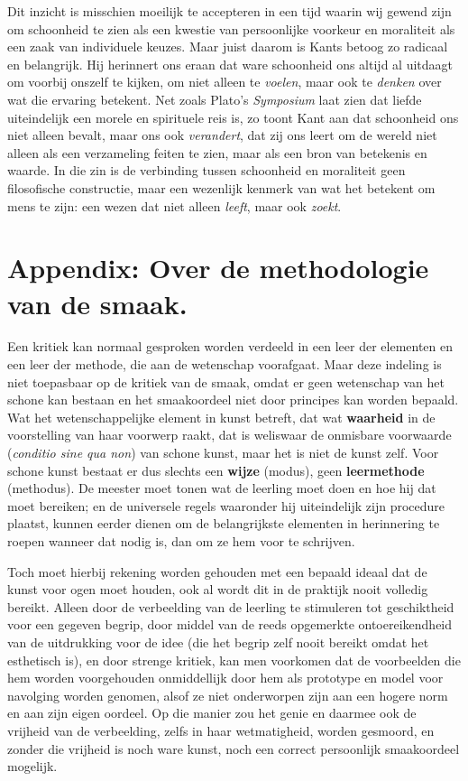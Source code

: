 \begin{mdframed}[leftmargin=0pt,rightmargin=0pt,backgroundcolor=blue!6,linecolor=white,innertopmargin=6pt,innerbottommargin=6pt]
Dit inzicht is misschien moeilijk te accepteren in een tijd waarin wij gewend zijn om schoonheid te zien als een kwestie van persoonlijke voorkeur en moraliteit als een zaak van individuele keuzes. Maar juist daarom is Kants betoog zo radicaal en belangrijk. Hij herinnert ons eraan dat ware schoonheid ons altijd al uitdaagt om voorbij onszelf te kijken, om niet alleen te \textit{voelen}, maar ook te \textit{denken} over wat die ervaring betekent. Net zoals Plato's \textit{Symposium} laat zien dat liefde uiteindelijk een morele en spirituele reis is, zo toont Kant aan dat schoonheid ons niet alleen bevalt, maar ons ook \textit{verandert}, dat zij ons leert om de wereld niet alleen als een verzameling feiten te zien, maar als een bron van betekenis en waarde. In die zin is de verbinding tussen schoonheid en moraliteit geen filosofische constructie, maar een wezenlijk kenmerk van wat het betekent om mens te zijn: een wezen dat niet alleen \textit{leeft}, maar ook \textit{zoekt}.
\end{mdframed}

\section{Appendix: Over de methodologie van de smaak.}

Een kritiek kan normaal gesproken worden verdeeld in een leer der elementen en een leer der methode, die aan de wetenschap voorafgaat. Maar deze indeling is niet toepasbaar op de kritiek van de smaak, omdat er geen wetenschap van het schone kan bestaan en het smaakoordeel niet door principes kan worden bepaald. Wat het wetenschappelijke element in kunst betreft, dat wat \textbf{waarheid} in de voorstelling van haar voorwerp raakt, dat is weliswaar de onmisbare voorwaarde (\textit{conditio sine qua non}) van schone kunst, maar het is niet de kunst zelf. Voor schone kunst bestaat er dus slechts een \textbf{wijze} (modus), geen \textbf{leermethode} (methodus). De meester moet tonen wat de leerling moet doen en hoe hij dat moet bereiken; en de universele regels waaronder hij uiteindelijk zijn procedure plaatst, kunnen eerder dienen om de belangrijkste elementen in herinnering te roepen wanneer dat nodig is, dan om ze hem voor te schrijven.

Toch moet hierbij rekening worden gehouden met een bepaald ideaal dat de kunst voor ogen moet houden, ook al wordt dit in de praktijk nooit volledig bereikt. Alleen door de verbeelding van de leerling te stimuleren tot geschiktheid voor een gegeven begrip, door middel van de reeds opgemerkte ontoereikendheid van de uitdrukking voor de idee (die het begrip zelf nooit bereikt omdat het esthetisch is), en door strenge kritiek, kan men voorkomen dat de voorbeelden die hem worden voorgehouden onmiddellijk door hem als prototype en model voor navolging worden genomen, alsof ze niet onderworpen zijn aan een hogere norm en aan zijn eigen oordeel. Op die manier zou het genie en daarmee ook de vrijheid van de verbeelding, zelfs in haar wetmatigheid, worden gesmoord, en zonder die vrijheid is noch ware kunst, noch een correct persoonlijk smaakoordeel mogelijk.

